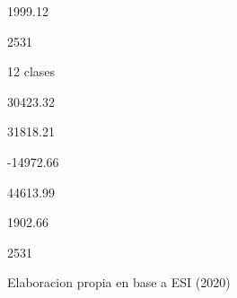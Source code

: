 \documentclass[
]{article}
\newenvironment{Shaded}{\begin{snugshade}}{\end{snugshade}}
\newcommand{\AttributeTok}[1]{\textcolor[rgb]{0.77,0.63,0.00}{#1}}
\newcommand{\DecValTok}[1]{\textcolor[rgb]{0.00,0.00,0.81}{#1}}
\newcommand{\FunctionTok}[1]{\textcolor[rgb]{0.00,0.00,0.00}{#1}}
\newcommand{\NormalTok}[1]{#1}
\newcommand{\OtherTok}[1]{\textcolor[rgb]{0.56,0.35,0.01}{#1}}
\newcommand{\SpecialCharTok}[1]{\textcolor[rgb]{0.00,0.00,0.00}{#1}}
\begin{document}
1999.12

2531

12 clases

30423.32

31818.21

-14972.66

44613.99

1902.66

2531

Elaboracion propia en base a ESI (2020)

\begin{Shaded}
\end{Shaded}
\end{document}
